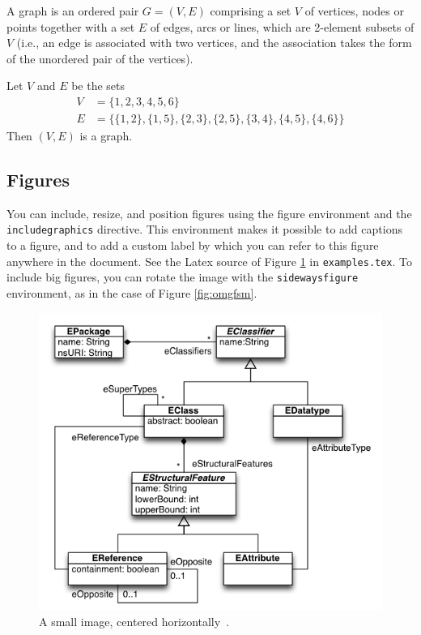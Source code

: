 \begin{mydef}
A graph is an ordered pair $G = (V, E)$ comprising a set $V$ of vertices, nodes or points together with a set $E$ of edges, arcs or lines, which are 2-element subsets of $V$ (i.e., an edge is associated with two vertices, and the association takes the form of the unordered pair of the vertices).
\end{mydef}

\begin{myexamp}
Let $V$ and $E$ be the sets
\begin{align*}
V &= \{1, 2, 3, 4, 5, 6\} \\
E &= \{\{1, 2\}, \{1, 5\}, \{2, 3\}, \{2, 5\}, \{3, 4\}, \{4, 5\}, \{4, 6\}\}
\end{align*}
Then $(V,E)$ is a graph.
\end{myexamp}

\subsection{Figures}
\label{sec:fig}
You can include, resize, and position figures using the figure environment and the \texttt{includegraphics} directive. This environment makes it possible to add captions to a figure, and to add a custom label by which you can refer to this figure anywhere in the document. See the Latex source of Figure \ref{fig:ecore} in \texttt{examples.tex}. To include big figures, you can rotate the image with the \texttt{sidewaysfigure} environment, as in the case of Figure \ref{fig:omgfsm}.
\begin{figure}[h]
\centering
\includegraphics[width=.7\textwidth]{figures/ecore.png}
\caption{A small image, centered horizontally~\cite{ecore}.}
\label{fig:ecore}
\end{figure}

